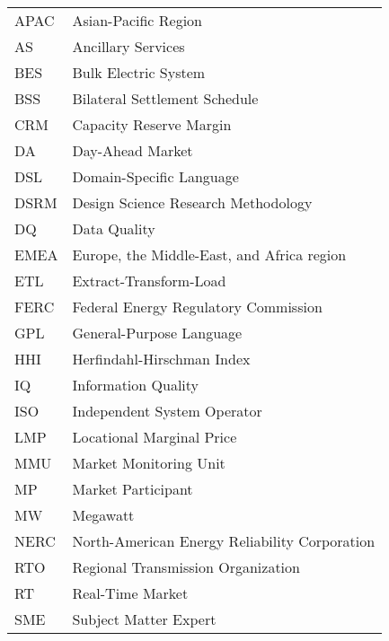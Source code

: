 \hspace*{-1.25in}
\vspace{12pt}
\begin{spacing}{1.0}
	\begin{longtable}[htbp]{@{}p{} p{}@{}}
        APAC & Asian-Pacific Region \\ [0.5ex]
	AS & Ancillary Services \\ [0.5ex]
        BES	& Bulk Electric System \\ [0.5ex]
        BSS & Bilateral Settlement Schedule \\ [0.5ex]
        CRM & Capacity Reserve Margin \\ [0.5ex]
        DA & Day-Ahead Market \\ [0.5ex]
        DSL & Domain-Specific Language \\ [0.5ex]
        DSRM & Design Science Research Methodology \\ [0.5ex]
        DQ & Data Quality \\ [0.5ex]
        EMEA & Europe, the Middle-East, and Africa region \\ [0.5ex]
        ETL & Extract-Transform-Load \\ [0.5ex]
        FERC & Federal Energy Regulatory Commission \\ [0.5ex]
        GPL & General-Purpose Language \\ [0.5ex]
        HHI & Herfindahl-Hirschman Index \\ [0.5ex]
        IQ & Information Quality \\ [0.5ex]
        ISO & Independent System Operator \\ [0.5ex]
        LMP & Locational Marginal Price \\ [0.5ex]
        MMU & Market Monitoring Unit \\ [0.5ex]
        MP & Market Participant \\ [0.5ex]
        MW & Megawatt \\ [0.5ex]
        NERC & North-American Energy Reliability Corporation \\ [0.5ex]
	RTO & Regional Transmission Organization \\	[0.5ex] %
        RT & Real-Time Market \\ [0.5ex]
        SME & Subject Matter Expert \\ [0.5ex]

\end{longtable}
\end{spacing}
